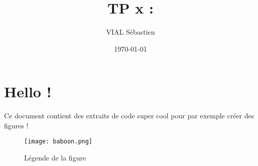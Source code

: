 \documentclass{article}
\title{TP x : }
\date{\today}
\author{VIAL Sébastien}
\begin{document}
\maketitle
\tableofcontents
\newpage

\section{Hello !}
Ce document contient des extraits de code super cool pour par exemple créer des figures !

\begin{figure}[ht]
  \begin{center}
    \texttt{[image: baboon.png]}
  \end{center}
  \caption{Légende de la figure}
  \label{fig:baboon}
\end{figure}
\end{document}
